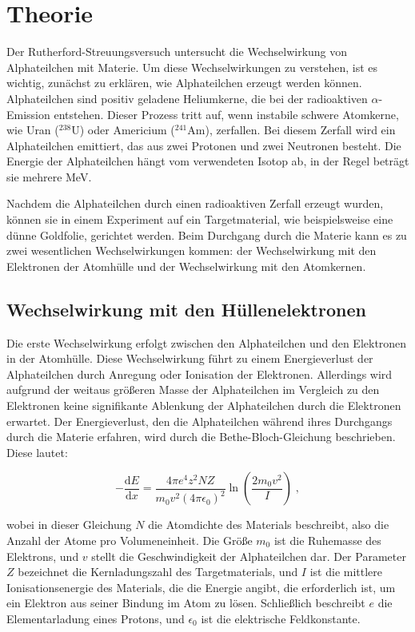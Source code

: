 \section[Theorie]{Theorie \textnormal{\cite{rutherford}}}

Der Rutherford-Streuungsversuch untersucht die Wechselwirkung von Alphateilchen mit Materie. Um diese Wechselwirkungen zu verstehen, ist es wichtig, zunächst zu erklären, wie Alphateilchen erzeugt werden können. Alphateilchen sind positiv geladene Heliumkerne, die bei der radioaktiven $\alpha$-Emission entstehen. Dieser Prozess tritt auf, wenn instabile schwere Atomkerne, wie Uran ($^{238}\mathrm{U}$) oder Americium ($^{241}\mathrm{Am}$), zerfallen. Bei diesem Zerfall wird ein Alphateilchen emittiert, das aus zwei Protonen und zwei Neutronen besteht. Die Energie der Alphateilchen hängt vom verwendeten Isotop ab, in der Regel beträgt sie mehrere MeV.

Nachdem die Alphateilchen durch einen radioaktiven Zerfall erzeugt wurden, können sie in einem Experiment auf ein Targetmaterial, wie beispielsweise eine dünne Goldfolie, gerichtet werden. Beim Durchgang durch die Materie kann es zu zwei wesentlichen Wechselwirkungen kommen: der Wechselwirkung mit den Elektronen der Atomhülle und der Wechselwirkung mit den Atomkernen.

\subsection*{Wechselwirkung mit den Hüllenelektronen}
Die erste Wechselwirkung erfolgt zwischen den Alphateilchen und den Elektronen in der Atomhülle. Diese Wechselwirkung führt zu einem Energieverlust der Alphateilchen durch Anregung oder Ionisation der Elektronen. Allerdings wird aufgrund der weitaus größeren Masse der Alphateilchen im Vergleich zu den Elektronen keine signifikante Ablenkung der Alphateilchen durch die Elektronen erwartet. Der Energieverlust, den die Alphateilchen während ihres Durchgangs durch die Materie erfahren, wird durch die Bethe-Bloch-Gleichung beschrieben. Diese lautet:

\begin{equation}
-\frac{\mathrm{d}E}{\mathrm{d}x} = \frac{4 \pi e^4 z^2 N Z}{m_0 v^2 (4 \pi \epsilon_0)^2} \ln \left(\frac{2 m_0 v^2}{I}\right)\; ,
\label{eqn:Bethe}
\end{equation}

wobei in dieser Gleichung $N$ die Atomdichte des Materials beschreibt, also die Anzahl der Atome pro Volumeneinheit. Die Größe $m_0$ ist die Ruhemasse des Elektrons, und $v$ stellt die Geschwindigkeit der Alphateilchen dar. Der Parameter $Z$ bezeichnet die Kernladungszahl des Targetmaterials, und $I$ ist die mittlere Ionisationsenergie des Materials, die die Energie angibt, die erforderlich ist, um ein Elektron aus seiner Bindung im Atom zu lösen. Schließlich beschreibt $e$ die Elementarladung eines Protons, und $\epsilon_0$ ist die elektrische Feldkonstante.

